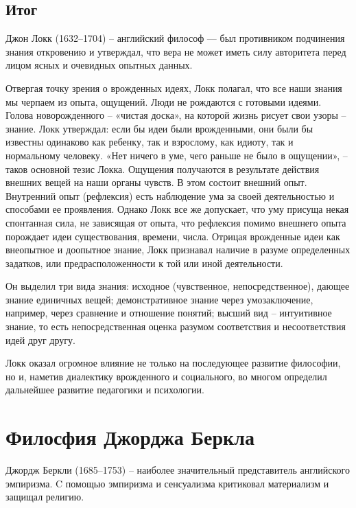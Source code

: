 \documentclass[a4paper, 14pt]{extreport}
\begin{document}
\subsection{Итог}

Джон Локк (1632--1704) -- английский философ --- был противником
подчинения знания откровению и утверждал, что вера не может иметь силу
авторитета перед лицом ясных и очевидных опытных данных.

Отвергая точку зрения о врожденных идеях, Локк полагал, что все наши
знания мы черпаем из опыта, ощущений. Люди не рождаются с готовыми
идеями. Голова новорожденного -- «чистая доска», на которой жизнь рисует
свои узоры -- знание. Локк утверждал: если бы идеи были врожденными, они
были бы известны одинаково как ребенку, так и взрослому, как идиоту, так
и нормальному человеку. «Нет ничего в уме, чего раньше не было в
ощущении», -- таков основной тезис Локка. Ощущения получаются в
результате действия внешних вещей на наши органы чувств. В этом состоит
внешний опыт. Внутренний опыт (рефлексия) есть наблюдение ума за своей
деятельностью и способами ее проявления. Однако Локк все же допускает,
что уму присуща некая спонтанная сила, не зависящая от опыта, что
рефлексия помимо внешнего опыта порождает идеи существования, времени,
числа. Отрицая врожденные идеи как внеопытное и доопытное знание, Локк
признавал наличие в разуме определенных задатков, или
предрасположенности к той или иной деятельности.

Он выделил три вида знания: исходное (чувственное, непосредственное),
дающее знание единичных вещей; демонстративное знание через
умозаключение, например, через сравнение и отношение понятий; высший вид
-- интуитивное знание, то есть непосредственная оценка разумом
соответствия и несоответствия идей друг другу.

Локк оказал огромное влияние не только на последующее развитие
философии, но и, наметив диалектику врожденного и социального, во многом
определил дальнейшее развитие педагогики и психологии.

\section{Филосфия Джорджа Беркла}

Джордж Беркли (1685--1753) -- наиболее значительный представитель
английского эмпиризма. C помощью эмпиризма и сенсуализма критиковал
материализм и защищал религию.
\end{document}
